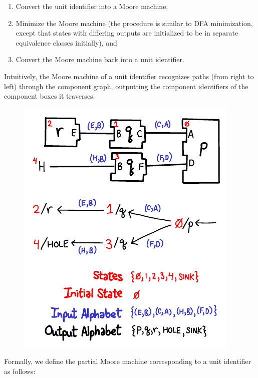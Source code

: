 \begin{enumerate}
\item Convert the unit identifier into a Moore machine,
\item Minimize the Moore machine (the procedure is similar to DFA
   minimization, except that states with differing outputs are
   initialized to be in separate equivalence classes initially), and
\item Convert the Moore machine back into a unit identifier.
\end{enumerate}

Intuitively, the Moore machine of a unit identifier recognizes paths
(from right to left) through the component graph, outputting the
component identifiers of the component boxes it traverses.

\begin{figure}[H]
\center\includegraphics{figures/moore-description.pdf}
\end{figure}

Formally, we define the partial Moore machine corresponding to a unit
identifier as follows:

